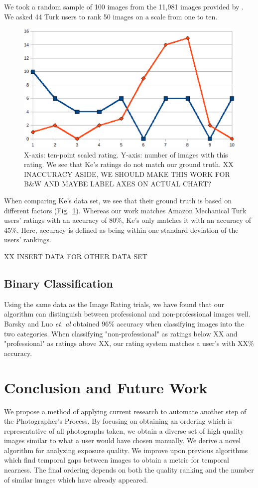 \documentclass[10pt,twocolumn,letterpaper]{article}
\begin{document}
We took a random sample of 100 images from the 11,981 images provided by \cite{springerlink:10.1007/978-3-540-88690-7_29}. We asked 44 Turk users to rank 50 images on a scale from one to ten.

\begin{figure}
  \centering
    \includegraphics[scale=0.40,clip]{ke_vs_us.eps}
  \caption{X-axis: ten-point scaled rating.  Y-axis: number of images with this rating. We see that Ke's ratings do not match our ground truth. XX INACCURACY ASIDE, WE SHOULD MAKE THIS WORK FOR B\&W AND MAYBE LABEL AXES ON ACTUAL CHART?}
  \label{fig:ke_vs_us}
\end{figure}
When comparing Ke's data set, we see that their ground truth is based on different factors (Fig.~\ref{fig:ke_vs_us}). Whereas our work matches Amazon Mechanical Turk users' ratings with an accuracy of 80\%, Ke's only matches it with an accuracy of 45\%. Here, accuracy is defined as being within one standard deviation of the users' rankings.

XX INSERT DATA FOR OTHER DATA SET

\subsection{Binary Classification} Using the same data as the Image Rating trials, we have found that our algorithm can distinguish between professional and non-professional images well. Barsky \cite{Yeh:2010:PPR:1873951.1873963} and Luo \emph{et. al}\cite{springerlink:10.1007/978-3-540-88690-7_29} obtained 96\% accuracy when classifying images into the two categories. When classifying "non-professional" as ratings below XX and "professional" as ratings above XX, our rating system matches a user's with XX\% accuracy.

\section{Conclusion and Future Work}
We propose a method of applying current research to automate another step of the Photographer's Process. By focusing on obtaining an ordering which is representative of all photographs taken, we obtain a diverse set of high quality images similar to what a user would have chosen manually. We derive a novel algorithm for analyzing exposure quality. We improve upon previous algorithms which find temporal gaps between images to obtain a metric for temporal nearness. The final ordering depends on both the quality ranking and the number of similar images which have already appeared.
\end{document}
